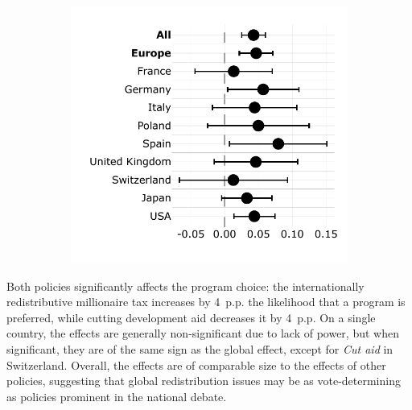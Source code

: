 \documentclass[12pt,english]{article}
\begin{document}
\begin{bibunit}
\begin{figure}[h!]
\begin{subfigure}{.49\textwidth}
  \includegraphics[height=.36\textheight]{../figures/country_comparison/program_preferred_by_millionaire_tax_in_program.pdf}%
\end{subfigure}
\end{figure}

Both policies significantly affects the program choice: the internationally redistributive millionaire tax increases by 4~p.p. the likelihood that a program is preferred, while cutting development aid decreases it by 4~p.p. On a single country, the effects are generally non-significant due to lack of power, but when significant, they are of the same sign as the global effect, except for \textit{Cut aid} in Switzerland. Overall, the effects are of comparable size to the effects of other policies, %
suggesting that global redistribution issues may be as vote-determining as policies prominent in the national debate. 


\end{bibunit}
\end{document}
